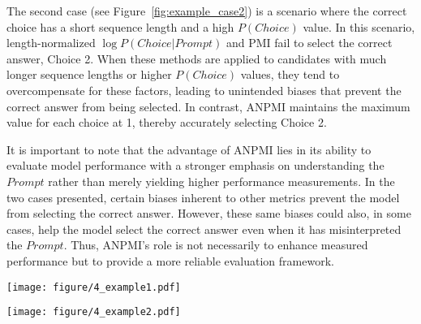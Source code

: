 {The second case (see Figure\hbox{~\ref{fig:example_case2}}) is a scenario where the correct choice has a short sequence length and a high \hbox{$P(Choice)$} value. In this scenario, length-normalized \hbox{$\log P(Choice | Prompt)$} and PMI fail to select the correct answer, Choice 2. When these methods are applied to candidates with much longer sequence lengths or higher \hbox{$P(Choice)$} values, they tend to overcompensate for these factors, leading to unintended biases that prevent the correct answer from being selected. In contrast, ANPMI maintains the maximum value for each choice at 1, thereby accurately selecting Choice 2.}

{It is important to note that the advantage of ANPMI lies in its ability to evaluate model performance with a stronger emphasis on understanding the $Prompt$ rather than merely yielding higher performance measurements. In the two cases presented, certain biases inherent to other metrics prevent the model from selecting the correct answer. However, these same biases could also, in some cases, help the model select the correct answer even when it has misinterpreted the $Prompt$. Thus, ANPMI's role is not necessarily to enhance measured performance but to provide a more reliable evaluation framework.}

\begin{figure*}[htbp]
   \centering
   \texttt{[image: figure/4\_example1.pdf]}
   \vspace*{-1\baselineskip}
   \caption{A case where the correct answer has a long sequence length and low prior probability. The model may select incorrect answers without normalization due to its wrong bias for choice.}
\label{fig:example_case1}
\end{figure*}

\begin{figure*}[htbp]
   \centering
   \texttt{[image: figure/4\_example2.pdf]}
   \vspace*{-1\baselineskip}
   \caption{A case where the correct answer has a short sequence length and high prior probability. The model may select incorrect answers due to the wrong normalization method.}
\label{fig:example_case2}
\end{figure*}